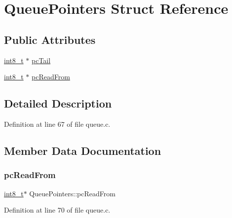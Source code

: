 \hypertarget{structQueuePointers}{}\section{Queue\+Pointers Struct Reference}
\label{structQueuePointers}
\subsection*{Public Attributes}
\begin{DoxyCompactItemize}
\item 
\hyperlink{stdint_8h_aef44329758059c91c76d334e8fc09700}{int8\+\_\+t} $\ast$ \hyperlink{structQueuePointers_acbbdc8eb47b348a824c7bced41512a38}{pc\+Tail}
\item 
\hyperlink{stdint_8h_aef44329758059c91c76d334e8fc09700}{int8\+\_\+t} $\ast$ \hyperlink{structQueuePointers_af381d02bbe6bc4a77934c6fd97598913}{pc\+Read\+From}
\end{DoxyCompactItemize}


\subsection{Detailed Description}


Definition at line 67 of file queue.\+c.



\subsection{Member Data Documentation}
\mbox{\label{structQueuePointers_af381d02bbe6bc4a77934c6fd97598913}} 
\subsubsection{\texorpdfstring{pc\+Read\+From}{pcReadFrom}}
{\footnotesize\ttfamily \hyperlink{stdint_8h_aef44329758059c91c76d334e8fc09700}{int8\+\_\+t}$\ast$ Queue\+Pointers\+::pc\+Read\+From}



Definition at line 70 of file queue.\+c.

\mbox{\label{structQueuePointers_acbbdc8eb47b348a824c7bced41512a38}} 
